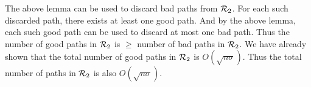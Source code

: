 





The above lemma can be used to discard bad paths from $\mathcal{R}_2$.
For each such discarded path, there exists at least one good path.
And by the above lemma, each such good path can be used to discard
at most one bad path. Thus the number of good paths in $\mathcal{R}_2$
is $\ge$ number of bad paths in $\mathcal{R}_2$.
We have already shown that the total number of good paths in $\mathcal{R}_2$
is $O(\sqrt{n\sigma})$.
Thus the total number of paths in $\mathcal{R}_2$ is also $O(\sqrt{n\sigma})$.

